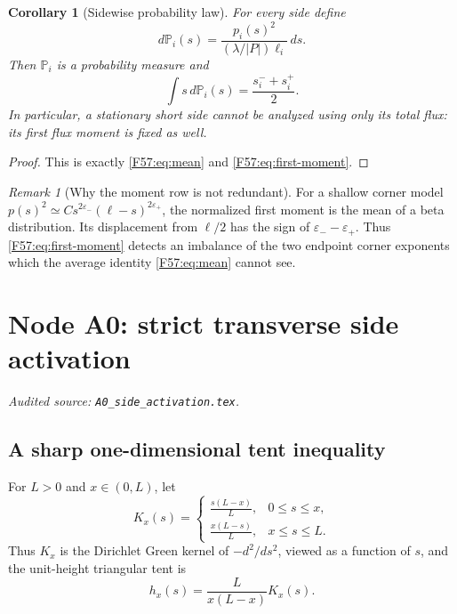 \documentclass[11pt]{amsart}
\numberwithin{equation}{section}
\newtheorem{corollary}[theorem]{Corollary}
\theoremstyle{definition}
\theoremstyle{remark}
\newtheorem{remark}[theorem]{Remark}
\begin{document}
\begin{corollary}[Sidewise probability law]\label{F57:cor:probability}
For every side define
\begin{equation}\label{F57:eq:probability}
 d\mathbb P_i(s)=
 \frac{p_i(s)^2}{(\lambda/|P|)\ell_i}\,ds.
\end{equation}
Then $\mathbb P_i$ is a probability measure and
\begin{equation}
 \int s\,d\mathbb P_i(s)=\frac{s_i^-+s_i^+}{2}.
\end{equation}
In particular, a stationary short side cannot be analyzed using only its
total flux: its first flux moment is fixed as well.
\end{corollary}

\begin{proof}
This is exactly \eqref{F57:eq:mean} and \eqref{F57:eq:first-moment}.
\end{proof}

\begin{remark}[Why the moment row is not redundant]
For a shallow corner model
$p(s)^2\simeq C s^{2\varepsilon_-}
(\ell-s)^{2\varepsilon_+}$, the normalized first moment is the mean of a
beta distribution.  Its displacement from $\ell/2$ has the sign of
$\varepsilon_--\varepsilon_+$.  Thus \eqref{F57:eq:first-moment} detects an
imbalance of the two endpoint corner exponents which the average identity
\eqref{F57:eq:mean} cannot see.
\end{remark}
\endgroup

\begingroup
\section{Node A0: strict transverse side activation}
\label{module:A0}
\noindent\textit{Audited source: \nolinkurl{A0_side_activation.tex}.}
\subsection{A sharp one-dimensional tent inequality}

For \(L>0\) and \(x\in(0,L)\), let
\begin{equation}\label{A0:eq:green}
 K_x(s)=
 \begin{cases}
  \displaystyle\frac{s(L-x)}{L},&0\le s\le x,\\[2mm]
  \displaystyle\frac{x(L-s)}{L},&x\le s\le L.
 \end{cases}
\end{equation}
Thus \(K_x\) is the Dirichlet Green kernel of \(-d^2/ds^2\), viewed as a
function of \(s\), and the unit-height triangular tent is
\begin{equation}\label{A0:eq:tent}
 h_x(s)=\frac{L}{x(L-x)}K_x(s).
\end{equation}
\end{document}
